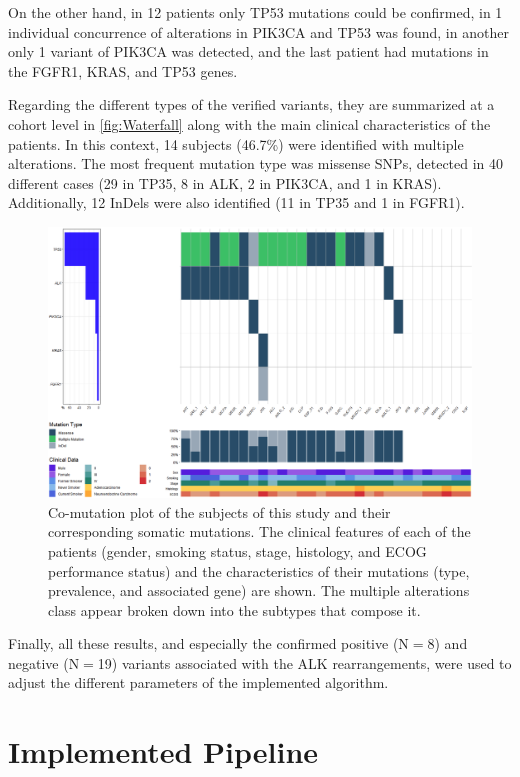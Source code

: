 On the other hand, in 12 patients only TP53 mutations could be confirmed, in 1 individual concurrence of alterations in PIK3CA and TP53 was found, in another only 1 variant of PIK3CA was detected, and the last patient had mutations in the FGFR1, KRAS, and TP53 genes.

Regarding the different types of the verified variants, they are summarized at a cohort level in \autoref{fig:Waterfall} along with the main clinical characteristics of the patients. In this context, 14 subjects (46.7\%) were identified with multiple alterations. The most frequent mutation type was missense SNPs, detected in 40 different cases (29 in TP35, 8 in ALK, 2 in PIK3CA, and 1 in KRAS). Additionally, 12 InDels were also identified (11 in TP35 and 1 in FGFR1).

\begin{figure}[ht]
    \centering
    \includegraphics[width=\textwidth]{Images/chapter_4/waterfall.png}
    \caption{Co-mutation plot of the subjects of this study and their corresponding somatic mutations. The clinical features of each of the patients (gender, smoking status, stage, histology, and ECOG performance status) and the characteristics of their mutations (type, prevalence, and associated gene) are shown. The multiple alterations class appear broken down into the subtypes that compose it.}
    \label{fig:Waterfall}
\end{figure}

Finally, all these results, and especially the confirmed positive (N$=$8) and negative (N$=$19) variants associated with the ALK rearrangements, were used to adjust the different parameters of the implemented algorithm.

\section{Implemented Pipeline}

